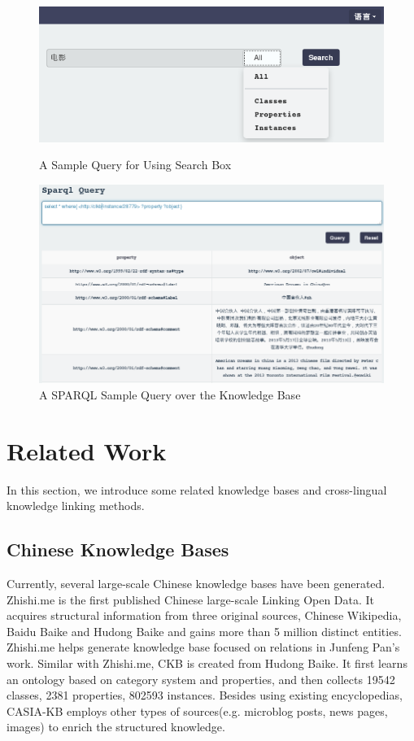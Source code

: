 \documentclass[runningheads,a4paper]{llncs}
\begin{document}
\begin{CJK*}{UTF8}{song}
\begin{figure}
    \centering
    \begin{minipage}[t]{0.8\textwidth}
        \centerline{\includegraphics[width=0.8\columnwidth]{fig/search-engine}}
        \caption{A Sample Query for Using Search Box }
        \label{fig:search-engine}
    \end{minipage}%
    \begin{minipage}[t]{0.8\textwidth}
        \centerline{\includegraphics[width=0.8\columnwidth]{fig/sparql-endpoint}}
        \caption{A SPARQL Sample Query over the Knowledge Base}
        \label{fig:sparql-endpoint}
    \end{minipage}%
\end{figure}

\section{Related Work}
\label{sec:work}
In this section, we introduce some related knowledge bases and cross-lingual knowledge linking methods.
\subsection{Chinese Knowledge Bases}
Currently, several large-scale Chinese knowledge bases have been generated. Zhishi.me\cite{niu2011zhishi,wang2014publishing} is the first published Chinese large-scale Linking Open Data. It acquires structural information from three original sources, Chinese Wikipedia, Baidu Baike and Hudong Baike and gains more than 5 million distinct entities. Zhishi.me helps generate knowledge base focused on relations in Junfeng Pan’s work\cite{pan2012building}.
Similar with Zhishi.me, CKB\cite{wang2012building} is created from Hudong Baike. It first learns an ontology based on category system and properties, and then collects 19542 classes, 2381 properties, 802593 instances. Besides using existing encyclopedias, CASIA-KB employs other types of sources(e.g. microblog posts, news pages, images) to enrich the structured knowledge.

\end{CJK*}
\end{document}
